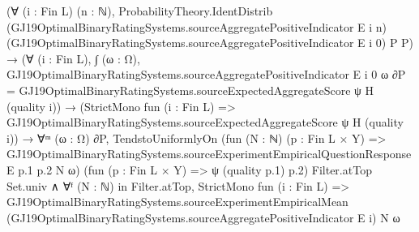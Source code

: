 \documentclass[10pt]{article}
\begin{document}
\begin{ReviewVerbatim}
                        (∀ (i : Fin L) (n : ℕ),
                            ProbabilityTheory.IdentDistrib
                              (GJ19OptimalBinaryRatingSystems.sourceAggregatePositiveIndicator E i n)
                              (GJ19OptimalBinaryRatingSystems.sourceAggregatePositiveIndicator E i 0) P P) →
                          (∀ (i : Fin L),
                              ∫ (ω : Ω), GJ19OptimalBinaryRatingSystems.sourceAggregatePositiveIndicator E i 0 ω ∂P =
                                GJ19OptimalBinaryRatingSystems.sourceExpectedAggregateScore ψ H (quality i)) →
                            (StrictMono fun (i : Fin L) =>
                                GJ19OptimalBinaryRatingSystems.sourceExpectedAggregateScore ψ H (quality i)) →
                              ∀ᵐ (ω : Ω) ∂P,
                                TendstoUniformlyOn
                                    (fun (N : ℕ) (p : Fin L × Y) =>
                                      GJ19OptimalBinaryRatingSystems.sourceExperimentEmpiricalQuestionResponse E p.1 p.2
                                        N ω)
                                    (fun (p : Fin L × Y) => ψ (quality p.1) p.2) Filter.atTop Set.univ ∧
                                  ∀ᶠ (N : ℕ) in Filter.atTop,
                                    StrictMono fun (i : Fin L) =>
                                      GJ19OptimalBinaryRatingSystems.sourceExperimentEmpiricalMean
                                        (GJ19OptimalBinaryRatingSystems.sourceAggregatePositiveIndicator E i) N ω
\end{ReviewVerbatim}
\end{document}

